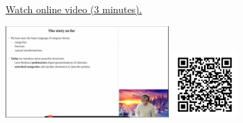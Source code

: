 
\begin{minipage}{10cm}
    \href{https://act4e-spring21.netlify.app/videos/spring2021-profunctors:recap-design.html}{Watch online video (3 minutes).}
        
    \href{https://act4e-spring21.netlify.app/videos/spring2021-profunctors:recap-design.html}{\includegraphics[height=3.5cm]{spring2021-profunctors:recap-design/thumbnails.jpg}}
    \href{https://act4e-spring21.netlify.app/videos/spring2021-profunctors:recap-design.html}{\includegraphics[height=2.5cm]{spring2021-profunctors:recap-design/qrcode.png}}
\end{minipage}
